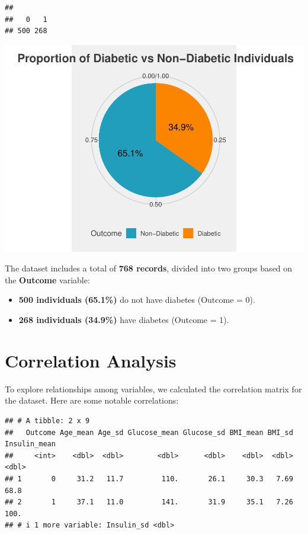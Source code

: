 \documentclass[
]{article}
\providecommand{\tightlist}{%
  \setlength{\itemsep}{0pt}\setlength{\parskip}{0pt}}
\begin{document}
\begin{verbatim}
## 
##   0   1 
## 500 268
\end{verbatim}

\begin{center}\includegraphics{Diabetes-Project_files/figure-latex/outcomes-1} \end{center}

The dataset includes a total of \textbf{768 records}, divided into two
groups based on the \textbf{Outcome} variable:

\begin{itemize}
\tightlist
\item
  \textbf{500 individuals (65.1\%)} do not have diabetes (Outcome =
  0).\\
\item
  \textbf{268 individuals (34.9\%)} have diabetes (Outcome = 1).
\end{itemize}

\section{Correlation Analysis}\label{correlation-analysis}

To explore relationships among variables, we calculated the correlation
matrix for the dataset. Here are some notable correlations:

\begin{verbatim}
## # A tibble: 2 x 9
##   Outcome Age_mean Age_sd Glucose_mean Glucose_sd BMI_mean BMI_sd Insulin_mean
##     <int>    <dbl>  <dbl>        <dbl>      <dbl>    <dbl>  <dbl>        <dbl>
## 1       0     31.2   11.7         110.       26.1     30.3   7.69         68.8
## 2       1     37.1   11.0         141.       31.9     35.1   7.26        100. 
## # i 1 more variable: Insulin_sd <dbl>
\end{verbatim}
\end{document}
